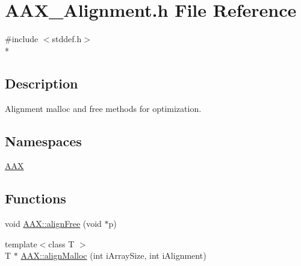 \hypertarget{a00157}{}\section{A\+A\+X\+\_\+\+Alignment.\+h File Reference}
\label{a00157}
{\ttfamily \#include $<$stddef.\+h$>$}\\*


\subsection{Description}
Alignment malloc and free methods for optimization. 

\subsection*{Namespaces}
\begin{DoxyCompactItemize}
\item 
 \hyperlink{a00288}{A\+A\+X}
\end{DoxyCompactItemize}
\subsection*{Functions}
\begin{DoxyCompactItemize}
\item 
void \hyperlink{a00288_aa7d7e69902012a6272de3ea9aa0264a9}{A\+A\+X\+::align\+Free} (void $\ast$p)
\item 
{\footnotesize template$<$class T $>$ }\\T $\ast$ \hyperlink{a00288_aaa3236d90a0dbbf30150d8a181f2d66b}{A\+A\+X\+::align\+Malloc} (int i\+Array\+Size, int i\+Alignment)
\end{DoxyCompactItemize}
